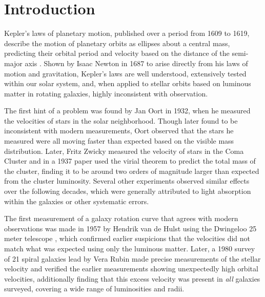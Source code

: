 \chapter{Introduction}
\label{intro_chapter}

Kepler's laws of planetary motion, published over a period from 1609 to 1619, describe the motion of planetary orbits as ellipses about a central mass, predicting their orbital period and velocity based on the distance of the semi-major axis \cite{kepler, russell}.
Shown by Isaac Newton in 1687 \cite{newton} to arise directly from his laws of motion and gravitation, Kepler's laws are well understood, extensively tested within our solar system, and, when applied to stellar orbits based on luminous matter in rotating galaxies, highly inconsistent with observation.

The first hint of a problem was found by Jan Oort in 1932, when he measured the velocities of stars in the solar neighborhood. 
Though later found to be inconsistent with modern measurements, Oort observed that the stars he measured were all moving faster than expected based on the visible mass distribution.
Later, Fritz Zwicky measured the velocity of stars in the Coma Cluster and in a 1937 paper \cite{Zwicky} used the virial theorem to predict the total mass of the cluster, finding it to be around two orders of magnitude larger than expected from the cluster luminosity. 
Several other experiments observed similar effects over the following decades, which were generally attributed to light absorption within the galaxies or other systematic errors.

The first measurement of a galaxy rotation curve that agrees with modern observations was made in 1957 by Hendrik van de Hulst using the Dwingeloo 25 meter telescope \cite{deHulst}, which confirmed earlier suspicions that the velocities did not match what was expected using only the luminous matter.
Later, a 1980 survey of 21 spiral galaxies lead by Vera Rubin \cite{RubinSurvey} made precise measurements of the stellar velocity and verified the earlier measurements showing unexpectedly high orbital velocities, additionally finding that this excess velocity was present in \textit{all} galaxies surveyed, covering a wide range of luminosities and radii.

